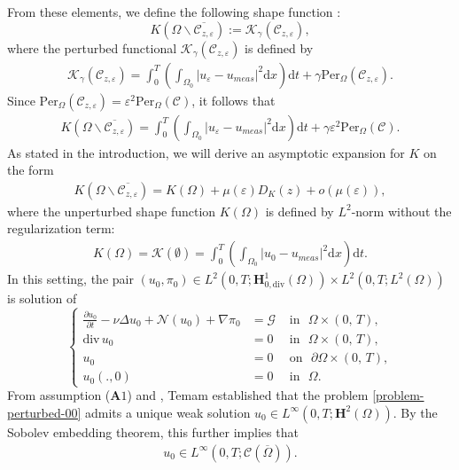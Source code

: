 \documentclass[a4paper,12pt,reqno,natbib]{amsart}
\newcommand{\dx} {\displaystyle\mathrm{d}x}
\newcommand{\dt} {\displaystyle\mathrm{d}t}
\def\N{\mathcal N}
\def\H{\textbf{H}}
\begin{document}
From these elements, we define the following shape function :
$$
K(\Omega\backslash\overline{\mathcal{C}_{z,\varepsilon}}):=\mathcal{K}_\gamma(\mathcal{C}_{z,\varepsilon}),
$$
where the perturbed functional $ \mathcal{K}_\gamma(\mathcal{C}_{z,\varepsilon})$ is defined by
\begin{align*}
\mathcal{K}_\gamma(\mathcal{C}_{z,\varepsilon})=\int_0^T \left(\int_{\Omega_0}\big|
u_\varepsilon-u_{meas}\big|^2 \dx\right)\dt+\gamma\text{Per}_\Omega(\mathcal{C}_{z,\varepsilon}).
\end{align*}
Since $\text{Per}_\Omega(\mathcal{C}_{z,\varepsilon})=\varepsilon^2\text{Per}_\Omega(\mathcal{C})$, it follows that
\begin{align}\label{perturbed-shape-function}
K(\Omega\backslash\overline{\mathcal{C}_{z,\varepsilon}})=\int_0^T \left(\int_{\Omega_0}\big|
u_\varepsilon-u_{meas}\big|^2 \dx\right)\dt+\gamma\varepsilon^2\text{Per}_\Omega(\mathcal{C}).
\end{align}
As stated in the introduction, we will derive an asymptotic expansion for
$K$ on the form
\begin{align}\label{asy}
K(\Omega\backslash\overline{\mathcal{C}_{z,\varepsilon}})=K(\Omega)+\mu(\varepsilon)D_K(z)+o(\mu(\varepsilon)),
\end{align}
where the unperturbed shape function $K(\Omega)$ is defined by $L^2$-norm without
the regularization term:
\begin{align}\label{unperturbed-shape-function}
K(\Omega)=\mathcal{K}(\emptyset)=\int_0^T \left(\int_{\Omega_0}\big|
u_0-u_{meas}\big|^2 \dx\right)\dt.
\end{align}
In this setting, the pair $(u_0,\pi_0)\in L^2(0,T; \H^1_{0,\text{div}}(\Omega))\times L^2(0,T;L^2(\Omega))$ is solution of
\begin{equation}\label{problem-perturbed-00}
\left\{
\begin{array}{rll}
\displaystyle \frac {\partial u_0}{\partial t}-\nu
\Delta u_0+ \N(u_0)+ \nabla \pi_0
 &= \mathcal{G} &\mbox{ in }  \,\,\Omega\times (0,\,T) ,\\
\mbox{div}\, u_0 &=  0 & \mbox{ in } \,\, \Omega \times (0,\,T) ,\\
u_0&= 0 & \mbox{ on }\,\,  \partial\Omega \times (0,\,T) , \\
u_0(.,0)&= 0&\mbox{ in } \,\,  \Omega.
\end{array}
 \right.
\end{equation}
From assumption (\textbf{A}$1$) and \cite[Theorems 3.7 and 3.8]{temam1973theory}, Temam established that the problem \eqref{problem-perturbed-00} admits a unique weak solution \( u_0\in L^\infty(0,T; \H^2(\Omega))\). By the Sobolev embedding theorem, this further implies that 
\begin{eqnarray}\label{regularity1}
    u_0 \in L^\infty(0,T; \mathcal{C}(\overline{\Omega})).
\end{eqnarray}
\end{document}
